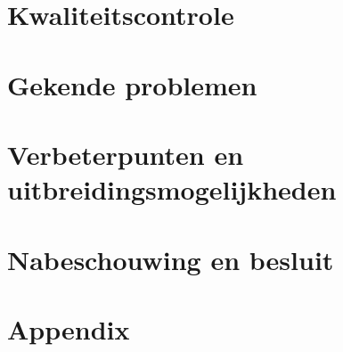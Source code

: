\documentclass[pdftex,a4paper,12pt,twoside]{report}
\begin{document}
\chapter{Kwaliteitscontrole}

\chapter{Gekende problemen}

\chapter{Verbeterpunten en uitbreidingsmogelijkheden}

\chapter{Nabeschouwing en besluit}




\clearpage
{}
\listoffigures

\clearpage
{}
\listoftables


\appendix
\chapter{Appendix}



\end{document}
